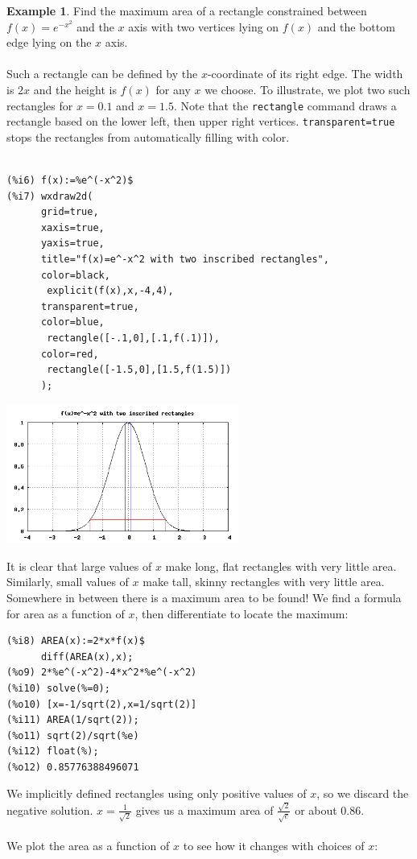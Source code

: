 \documentclass[10.5pt,twoside]{report}
\theoremstyle{definition}
\newtheorem{exmp}{Example}[section]
\begin{document}
\begin{exmp}  Find the maximum area of a rectangle constrained between $f(x)=e^{-x^2}$ and the $x$ axis with two vertices lying on $f(x)$ and the bottom edge lying on the $x$ axis.  \\
${}$\\
Such a rectangle can be defined by the $x$-coordinate of its right edge.  The width is $2x$ and the height is $f(x)$ for any $x$ we choose.  To illustrate, we plot two such rectangles for $x=0.1$ and $x=1.5$.  Note that the \verb|rectangle| command draws a rectangle based on the lower left, then upper right vertices.  \verb|transparent=true| stops the rectangles from automatically filling with color.

\begin{verbatim}

(%i6) f(x):=%e^(-x^2)$
(%i7) wxdraw2d(
      grid=true,
      xaxis=true,
      yaxis=true,
      title="f(x)=e^-x^2 with two inscribed rectangles",
      color=black,
       explicit(f(x),x,-4,4),
      transparent=true,
      color=blue,
       rectangle([-.1,0],[.1,f(.1)]),
      color=red,
       rectangle([-1.5,0],[1.5,f(1.5)])
      );
\end{verbatim}

\includegraphics[width=3in]{example_5_3_2_1}

It is clear that large values of $x$ make long, flat rectangles with very little area.  Similarly, small values of $x$ make tall, skinny rectangles with very little area.  Somewhere in between there is a maximum area to be found!  We find a formula for area as a function of $x$, then differentiate to locate the maximum:

\begin{verbatim}
(%i8) AREA(x):=2*x*f(x)$
      diff(AREA(x),x);
(%o9) 2*%e^(-x^2)-4*x^2*%e^(-x^2)
(%i10) solve(%=0);
(%o10) [x=-1/sqrt(2),x=1/sqrt(2)]
(%i11) AREA(1/sqrt(2));
(%o11) sqrt(2)/sqrt(%e)
(%i12) float(%);
(%o12) 0.85776388496071
\end{verbatim}

We implicitly defined rectangles using only positive values of $x$, so we discard the negative solution.  $x=\frac{1}{\sqrt{2}}$ gives us a maximum area of $\frac{\sqrt{2}}{\sqrt{e}}$ or about 0.86.  \\
${}$\\
We plot the area as a function of $x$ to see how it changes with choices of $x$:


\end{exmp}
\end{document}
